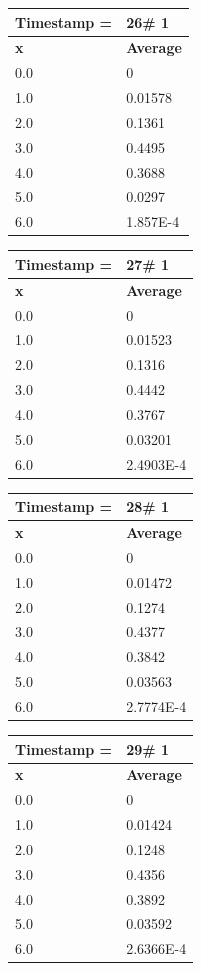 \begin{tabular}{|l||l|}
\hline
\textbf{Timestamp =} & \textbf{26}\# 1\\\hline
	\textbf{x} & \textbf{Average} \\ \hline
\hline
	0.0 & 0 \\ \hline
	1.0 & 0.01578 \\ \hline
	2.0 & 0.1361 \\ \hline
	3.0 & 0.4495 \\ \hline
	4.0 & 0.3688 \\ \hline
	5.0 & 0.0297 \\ \hline
	6.0 & 1.857E-4 \\ \hline
\end{tabular}
\begin{tabular}{|l||l|}
\hline
\textbf{Timestamp =} & \textbf{27}\# 1\\\hline
	\textbf{x} & \textbf{Average} \\ \hline
\hline
	0.0 & 0 \\ \hline
	1.0 & 0.01523 \\ \hline
	2.0 & 0.1316 \\ \hline
	3.0 & 0.4442 \\ \hline
	4.0 & 0.3767 \\ \hline
	5.0 & 0.03201 \\ \hline
	6.0 & 2.4903E-4 \\ \hline
\end{tabular}

\begin{tabular}{|l||l|}
\hline
\textbf{Timestamp =} & \textbf{28}\# 1\\\hline
	\textbf{x} & \textbf{Average} \\ \hline
\hline
	0.0 & 0 \\ \hline
	1.0 & 0.01472 \\ \hline
	2.0 & 0.1274 \\ \hline
	3.0 & 0.4377 \\ \hline
	4.0 & 0.3842 \\ \hline
	5.0 & 0.03563 \\ \hline
	6.0 & 2.7774E-4 \\ \hline
\end{tabular}
\begin{tabular}{|l||l|}
\hline
\textbf{Timestamp =} & \textbf{29}\# 1\\\hline
	\textbf{x} & \textbf{Average} \\ \hline
\hline
	0.0 & 0 \\ \hline
	1.0 & 0.01424 \\ \hline
	2.0 & 0.1248 \\ \hline
	3.0 & 0.4356 \\ \hline
	4.0 & 0.3892 \\ \hline
	5.0 & 0.03592 \\ \hline
	6.0 & 2.6366E-4 \\ \hline
\end{tabular}

